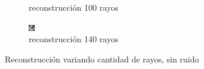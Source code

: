 \documentclass[11pt]{beamer}
\begin{document}
\begin{frame}
\begin{figure}[H]
\begin{subfigure}[h]{0.3\textwidth}
            \caption{reconstrucción 100 rayos}
            \label{fig:reconstruccion 100 rayos}
        \end{subfigure}%
        \hfill
        \begin{subfigure}[h]{0.3\textwidth} 
            \includegraphics[width=\textwidth]{img/tomo_rayos_140.png}
            \caption{reconstrucción 140 rayos}
            \label{fig:reconstruccion 140 rayos}
        \end{subfigure}
        \caption{Reconstrucción variando cantidad de rayos, sin ruido}
    \end{figure}
\end{frame}
\end{document}
